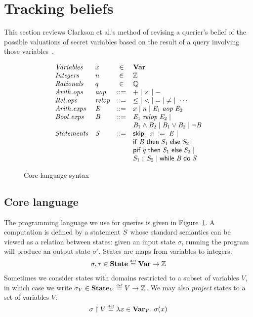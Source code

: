 \section{Tracking beliefs}
\label{sec:belief}

This section reviews Clarkson et al.'s method of revising a querier's
belief of the possible valuations of secret variables based on the
result of a query involving those
variables~\cite{clarkson09quantifying}.

\begin{figure}[t]
\[
\begin{array}{llcl}
\mathit{Variables} & x & \in & \vars \\ 
\mathit{Integers} & n & \in & \Integer \\
\mathit{Rationals} & q & \in & \Rational \\
\mathit{Arith. ops} & \arithop &::= & + \mid \times \mid - \\
\mathit{Rel. ops} & \relop &::= & \leq \;\mid\; < \;\mid\; = \;\mid\; \neq \;\mid\; \cdots
\\
\mathit{Arith. exps} & \aexp &::= & x \mid n \mid \aop{\aexp_1}{\aexp_2} \\
\mathit{Bool. exps} & \bexp &::= & \bop{\aexp_1}{\aexp_2} \mid \\
& && \bexp_1 \wedge \bexp_2 \mid \bexp_1 \vee \bexp_2 \mid \aneg{\bexp} \\

\mathit{Statements} & \stmt &::= & \sskip \mid \sassign{x}{\aexp} \mid \\
&     && \sif{\bexp}{\stmt_1}{\stmt_2} \mid \\
&     && \spif{q}{\stmt_1}{\stmt_2} \mid \\
&     && \sseq{\stmt_1}{\stmt_2} \mid \swhile{\bexp}{\stmt} %
\end{array}
\]
\caption{Core language syntax}
\label{fig:syntax}
\end{figure}

\subsection{Core language}

The programming language we use for queries is given in
Figure~\ref{fig:syntax}.  A computation is defined by a statement
$\mathit{S}$ whose standard semantics can be viewed as a relation between
states: given an input state $\sigma$, running the program will
produce an output state $\sigma'$.  States are maps from variables to
integers:
$$\begin{array}{l}
\sigma, \tau \in \textbf{State} \stackrel{\smash{\scriptscriptstyle \mathrm{def}}}= \textbf{Var} \rightarrow \mathbb{Z}
\end{array}$$
Sometimes we consider states with domains restricted to a
subset of variables $V$, in which case we write $\sigma_V \in \textbf{State}_V \stackrel{\smash{\scriptscriptstyle \mathrm{def}}}= V
\rightarrow \mathbb{Z}$.  We may also \emph{project}
states to a set of variables $V$:
\[\sigma \upharpoonright V \stackrel{\smash{\scriptscriptstyle \mathrm{def}}}= \lambda x \in \textbf{Var}_V . \; \sigma(x)\]

